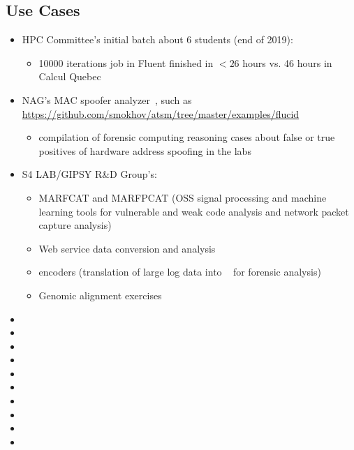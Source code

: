\documentclass{easychair}
\begin{document}
\subsection{Use Cases}
\label{sect:cases}

\begin{itemize}
	\item 
HPC Committee's initial batch about 6 students (end of 2019):
\begin{itemize}
	\item 
10000 iterations job in Fluent finished in $<26$ hours vs. 46 hours in Calcul Quebec
\end{itemize}
	\item 
NAG's MAC spoofer analyzer~\cite{mac-spoofer-analyzer-intro-c3s2e2014,mac-spoofer-analyzer-detail-fps2014},
such as \url{https://github.com/smokhov/atsm/tree/master/examples/flucid}
\begin{itemize}
	\item 
compilation of forensic computing reasoning cases about false or true positives of hardware address spoofing in the labs
\end{itemize}
	\item 
S4 LAB/GIPSY R\&D Group's:
\begin{itemize}
	\item 
MARFCAT and MARFPCAT (OSS signal processing and machine learning tools for 
vulnerable and weak code analysis and network packet capture
analysis)~\cite{marfcat-nlp-ai2014,marfcat-sate2010-nist,fingerprinting-mal-traffic}
	\item 
Web service data conversion and analysis
	\item 
{\flucid} encoders (translation of large log data into {\flucid}~\cite{mokhov-phd-thesis-2013} for forensic analysis)
	\item 
Genomic alignment exercises
\end{itemize}
\item
{}
\item
{}
\item
{}
\item
{}
\item
{}
\item
{}
\item
{}
\item
{}
\item
{}
\item
{}


\end{itemize}
\end{document}
